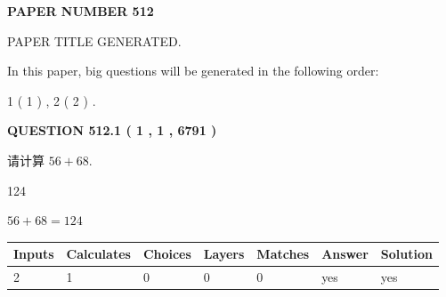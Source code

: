 \documentclass{ctexart}
\begin{document}
   
 {\textbf{ \Large{ PAPER NUMBER  512  }}}
   
   
\vspace{0.2in}
   
   
   
   
   
   
   
   
 \vspace{0.2in}
 
 
 
 
   
   
 PAPER TITLE GENERATED.
   
   
   
\vspace{0.2in}
   
In this paper, big questions will be generated in the following order: 
   
   
   1 ( 1 )
 ,
   2 ( 2 )
 .
  
\vspace{0.2in}
  
{\textbf{\Large{QUESTION
512.1 
 ( 1 , 1 , 6791 )
}}}
  
  
 
请计算 $ %
56 +  %
68 $.
 
 
 
\noindent{}
 
 

124
 
 
\noindent{}
 
 

 
 
 
\noindent{}
 
 

$ %
56 +  %
68=   %
124$
 
 
\noindent{}
 
 

 
   
   
   
   
\noindent\begin{tabular}{|l|l|l|l|l|l|l|}
 \hline
Inputs & Calculates & Choices & Layers & Matches & Answer & Solution \\ \hline
 2  & 
 1  & 
 0
  & 
 0  & 
 0  & 
  yes & 
  yes 
  \\ \hline
 \end{tabular}
   
\end{document}
